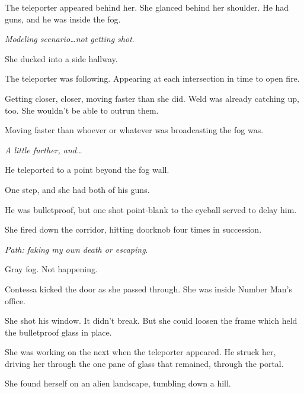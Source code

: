 The teleporter appeared behind her.  She glanced behind her shoulder.  He had guns, and he was inside the fog.



\emph{Modeling scenario\ldots not getting shot}.



She ducked into a side hallway.



The teleporter was following.  Appearing at each intersection in time to open fire.



Getting closer, closer, moving faster than she did.  Weld was already catching up, too.  She wouldn't be able to outrun them.



Moving faster than whoever or whatever was broadcasting the fog was.



\emph{A little further, and\ldots}



He teleported to a point beyond the fog wall.



One step, and she had both of his guns.



He was bulletproof, but one shot point-blank to the eyeball served to delay him.



She fired down the corridor, hitting doorknob four times in succession.



\emph{Path: faking my own death or escaping}.



Gray fog.  Not happening.



Contessa kicked the door as she passed through.  She was inside Number Man's office.



She shot his window.  It didn't break.  But she could loosen the frame which held the bulletproof glass in place.



She was working on the next when the teleporter appeared.  He struck her, driving her through the one pane of glass that remained, through the portal.



She found herself on an alien landscape, tumbling down a hill.



